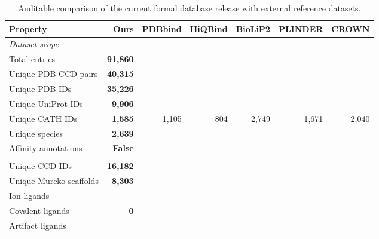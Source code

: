 \documentclass[10pt]{article}
\begin{document}
\begin{table}[t]
\centering
\small
\begin{threeparttable}
\caption{Auditable comparison of the current formal database release with external reference datasets.}
\label{tab:dataset-comparison}
\begin{adjustbox}{max width=\textwidth}
\begin{tabular}{lrrrrrr}
\toprule
Property & \textbf{Ours} & PDBbind & HiQBind & BioLiP2 & PLINDER & CROWN \\
\midrule
\multicolumn{7}{l}{\textit{Dataset scope}} \\
Total entries & \textbf{91,860} & \textemdash{} & \textemdash{} & \textemdash{} & \textemdash{} & \textemdash{} \\
Unique PDB-CCD pairs & \textbf{40,315} & \textemdash{} & \textemdash{} & \textemdash{} & \textemdash{} & \textemdash{} \\
Unique PDB IDs & \textbf{35,226} & \textemdash{} & \textemdash{} & \textemdash{} & \textemdash{} & \textemdash{} \\
Unique UniProt IDs & \textbf{9,906} & \textemdash{} & \textemdash{} & \textemdash{} & \textemdash{} & \textemdash{} \\
Unique CATH IDs & \textbf{1,585} & 1,105 & 804 & 2,749 & 1,671 & 2,040 \\
Unique species & \textbf{2,639} & \textemdash{} & \textemdash{} & \textemdash{} & \textemdash{} & \textemdash{} \\
Affinity annotations & \textbf{False} & \textemdash{} & \textemdash{} & \textemdash{} & \textemdash{} & \textemdash{} \\
\addlinespace
\multicolumn{7}{l}{\textit{Ligand diversity}} \\
Unique CCD IDs & \textbf{16,182} & \textemdash{} & \textemdash{} & \textemdash{} & \textemdash{} & \textemdash{} \\
Unique Murcko scaffolds & \textbf{8,303} & \textemdash{} & \textemdash{} & \textemdash{} & \textemdash{} & \textemdash{} \\
Ion ligands & \textbf{\textemdash{}} & \textemdash{} & \textemdash{} & \textemdash{} & \textemdash{} & \textemdash{} \\
Covalent ligands & \textbf{0} & \textemdash{} & \textemdash{} & \textemdash{} & \textemdash{} & \textemdash{} \\
Artifact ligands & \textbf{\textemdash{}} & \textemdash{} & \textemdash{} & \textemdash{} & \textemdash{} & \textemdash{} \\

\end{tabular}
\end{adjustbox}
\end{threeparttable}
\end{table}
\end{document}
